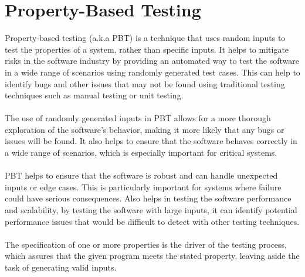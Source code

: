 \documentclass{report}
\theoremstyle{definition}
\theoremstyle{definition}
\begin{document}
\section{Property-Based Testing}

Property-based testing (a.k.a PBT) is a technique that uses random inputs to test the properties of a system, rather than specific inputs. It helps to mitigate risks in the software industry by providing an automated way to test the software in a wide range of scenarios using randomly generated test cases. This can help to identify bugs and other issues that may not be found using traditional testing techniques such as manual testing or unit testing.\\\\
The use of randomly generated inputs in PBT allows for a more thorough exploration of the software's behavior, making it more likely that any bugs or issues will be found. It also helps to ensure that the software behaves correctly in a wide range of scenarios, which is especially important for critical systems.\\\\
PBT helps to ensure that the software is robust and can handle unexpected inputs or edge cases. This is particularly important for systems where failure could have serious consequences. Also helps in testing the software performance and scalability, by testing the software with large inputs, it can identify potential performance issues that would be difficult to detect with other testing techniques.\\\\
The specification of one or more properties is the driver of the testing process, which assures that the given program meets the stated property, leaving aside the task of generating valid inputs.\\
\end{document}
